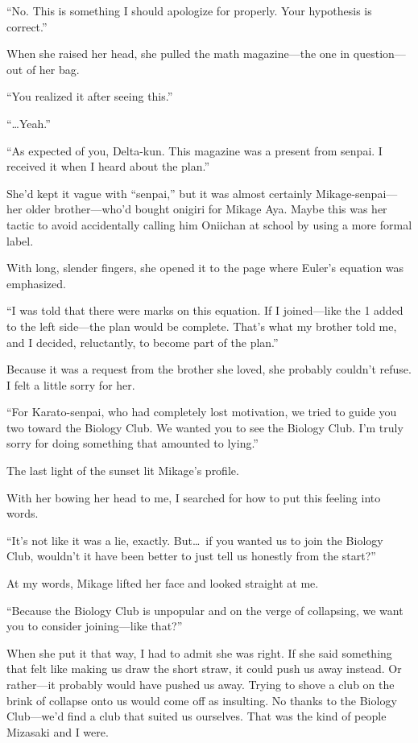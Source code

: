 \documentclass[
    a4paper,
    12pt,
    twoside,
    openany,
    UTF8,
    fontset=windows
]{ctexbook}
\begin{document}
``No. This is something I should apologize for properly. Your hypothesis is correct.''

When she raised her head, she pulled the math magazine---the one in question---out of her bag.

``You realized it after seeing this.''

``\dots Yeah.''

``As expected of you, Delta-kun. This magazine was a present from senpai. I received it when I heard about the plan.''

She'd kept it vague with ``senpai,'' but it was almost certainly Mikage-senpai---her older brother---who'd bought onigiri for Mikage Aya. Maybe this was her tactic to avoid accidentally calling him Oniichan at school by using a more formal label.

With long, slender fingers, she opened it to the page where Euler's equation was emphasized.

``I was told that there were marks on this equation. If I joined---like the 1 added to the left side---the plan would be complete. That's what my brother told me, and I decided, reluctantly, to become part of the plan.''

Because it was a request from the brother she loved, she probably couldn't refuse. I felt a little sorry for her.

``For Karato-senpai, who had completely lost motivation, we tried to guide you two toward the Biology Club. We wanted you to see the Biology Club. I'm truly sorry for doing something that amounted to lying.''

The last light of the sunset lit Mikage's profile.

With her bowing her head to me, I searched for how to put this feeling into words.

``It's not like it was a lie, exactly. But\dots\ if you wanted us to join the Biology Club, wouldn't it have been better to just tell us honestly from the start?''

At my words, Mikage lifted her face and looked straight at me.

``Because the Biology Club is unpopular and on the verge of collapsing, we want you to consider joining---like that?''

When she put it that way, I had to admit she was right. If she said something that felt like making us draw the short straw, it could push us away instead. Or rather---it probably would have pushed us away. Trying to shove a club on the brink of collapse onto us would come off as insulting. No thanks to the Biology Club---we'd find a club that suited us ourselves. That was the kind of people Mizasaki and I were.
\end{document}

